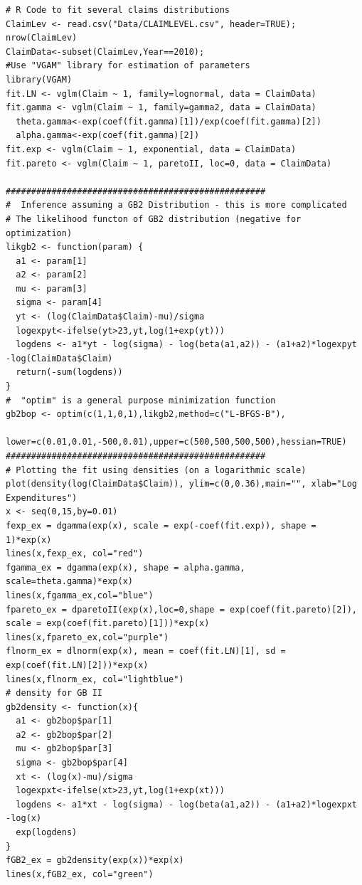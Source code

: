 \documentclass[]{book}
\begin{document}
\hypertarget{display.FitClaimDistn.2}{}
\begin{verbatim}
# R Code to fit several claims distributions
ClaimLev <- read.csv("Data/CLAIMLEVEL.csv", header=TRUE); nrow(ClaimLev)
ClaimData<-subset(ClaimLev,Year==2010); 
#Use "VGAM" library for estimation of parameters 
library(VGAM)
fit.LN <- vglm(Claim ~ 1, family=lognormal, data = ClaimData)
fit.gamma <- vglm(Claim ~ 1, family=gamma2, data = ClaimData)
  theta.gamma<-exp(coef(fit.gamma)[1])/exp(coef(fit.gamma)[2]) 
  alpha.gamma<-exp(coef(fit.gamma)[2])
fit.exp <- vglm(Claim ~ 1, exponential, data = ClaimData)
fit.pareto <- vglm(Claim ~ 1, paretoII, loc=0, data = ClaimData)

###################################################
#  Inference assuming a GB2 Distribution - this is more complicated
# The likelihood functon of GB2 distribution (negative for optimization)
likgb2 <- function(param) {
  a1 <- param[1]
  a2 <- param[2]
  mu <- param[3]
  sigma <- param[4]
  yt <- (log(ClaimData$Claim)-mu)/sigma
  logexpyt<-ifelse(yt>23,yt,log(1+exp(yt)))
  logdens <- a1*yt - log(sigma) - log(beta(a1,a2)) - (a1+a2)*logexpyt -log(ClaimData$Claim) 
  return(-sum(logdens))
}
#  "optim" is a general purpose minimization function
gb2bop <- optim(c(1,1,0,1),likgb2,method=c("L-BFGS-B"),
                lower=c(0.01,0.01,-500,0.01),upper=c(500,500,500,500),hessian=TRUE)
###################################################
# Plotting the fit using densities (on a logarithmic scale)
plot(density(log(ClaimData$Claim)), ylim=c(0,0.36),main="", xlab="Log Expenditures")
x <- seq(0,15,by=0.01)
fexp_ex = dgamma(exp(x), scale = exp(-coef(fit.exp)), shape = 1)*exp(x)
lines(x,fexp_ex, col="red")
fgamma_ex = dgamma(exp(x), shape = alpha.gamma, scale=theta.gamma)*exp(x)
lines(x,fgamma_ex,col="blue")
fpareto_ex = dparetoII(exp(x),loc=0,shape = exp(coef(fit.pareto)[2]), scale = exp(coef(fit.pareto)[1]))*exp(x)
lines(x,fpareto_ex,col="purple")
flnorm_ex = dlnorm(exp(x), mean = coef(fit.LN)[1], sd = exp(coef(fit.LN)[2]))*exp(x)
lines(x,flnorm_ex, col="lightblue")
# density for GB II
gb2density <- function(x){
  a1 <- gb2bop$par[1]
  a2 <- gb2bop$par[2]
  mu <- gb2bop$par[3]
  sigma <- gb2bop$par[4]
  xt <- (log(x)-mu)/sigma
  logexpxt<-ifelse(xt>23,yt,log(1+exp(xt)))
  logdens <- a1*xt - log(sigma) - log(beta(a1,a2)) - (a1+a2)*logexpxt -log(x) 
  exp(logdens)
}
fGB2_ex = gb2density(exp(x))*exp(x)
lines(x,fGB2_ex, col="green")
\end{verbatim}


\end{document}
